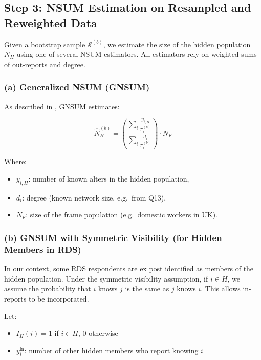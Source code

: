 \documentclass[
  12pt,
  letterpaper,
  DIV=11,
  numbers=noendperiod]{scrartcl}
\theoremstyle{plain}
\theoremstyle{definition}
\begin{document}
\subsection{Step 3: NSUM Estimation on Resampled and Reweighted
Data}\label{step-3-nsum-estimation-on-resampled-and-reweighted-data}

Given a bootstrap sample \(\mathcal{S}^{(b)}\), we estimate the size of
the hidden population \(N_H\) using one of several NSUM estimators. All
estimators rely on weighted sums of out-reports and degree.

\subsubsection{(a) Generalized NSUM
(GNSUM)}\label{a-generalized-nsum-gnsum}

As described in \textcite{feeh16-generalizing}, GNSUM estimates:

\[\hat{N}_H^{(b)} = \left( \frac{\sum_{i} \frac{y_{i,H}}{\pi_i^{(b)}}}{\sum_{i} \frac{d_i}{\pi_i^{(b)}}} \right) \cdot N_F\]

Where:

\begin{itemize}
\item
  \(y_{i,H}\): number of known alters in the hidden population,
\item
  \(d_i\): degree (known network size, e.g.~from Q13),
\item
  \(N_F\): size of the frame population (e.g.~domestic workers in UK).
\end{itemize}

\subsubsection{(b) GNSUM with Symmetric Visibility (for Hidden Members
in
RDS)}\label{b-gnsum-with-symmetric-visibility-for-hidden-members-in-rds}

In our context, some RDS respondents are ex post identified as members
of the hidden population. Under the symmetric visibility assumption, if
\(i \in H\), we assume the probability that \(i\) knows \(j\) is the
same as \(j\) knows \(i\). This allows in-reports to be incorporated.

Let:

\begin{itemize}
\item
  \(I_H(i) = 1\) if \(i \in H\), 0 otherwise
\item
  \(y_{i}^{\text{in}}\): number of other hidden members who report
  knowing \(i\)
\end{itemize}
\end{document}
